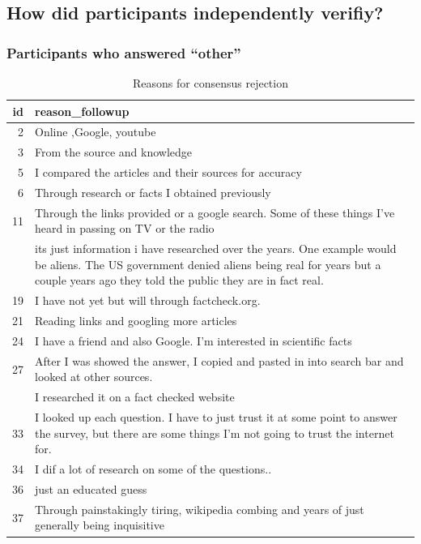\documentclass[
  doc,floatsintext]{apa6}
\begin{document}
\subsection{How did participants independently verifiy?}\label{how-did-participants-independently-verifiy-1}

\subsubsection{Participants who answered ``other''}\label{participants-who-answered-other-3}

\begin{longtable}[t]{>{}r>{\raggedright\arraybackslash}p{30em}}
\caption{\label{tab:exp4-independent-verification}Reasons for consensus rejection}\\
\toprule
id & reason\_followup\\
\midrule
2 & Online ,Google, youtube\\
3 & From the source and knowledge\\
5 & I compared the articles and their sources for accuracy\\
6 & Through research or facts I obtained previously\\
11 & Through the links provided or a google search. Some of these things I've heard in passing on TV or the radio\\
\addlinespace
17 & its just information i have researched over the years. One example would be aliens. The US government denied aliens being real for years but a couple years ago they told the public they are in fact real.\\
19 & I have not yet but will through factcheck.org.\\
21 & Reading links and googling more articles\\
24 & I have a friend and also Google.  I'm interested in scientific facts\\
27 & After I was showed the answer, I copied and pasted in into search bar and looked at other sources.\\
\addlinespace
31 & I researched it on a fact checked website\\
33 & I looked up each question. I have to just trust it at some point to answer the survey, but there are some things I'm not going to trust the internet for.\\
34 & I dif a lot of research on some of the questions..\\
36 & just an educated guess\\
37 & Through painstakingly tiring, wikipedia combing and years of just generally being inquisitive\\

\end{longtable}
\end{document}
